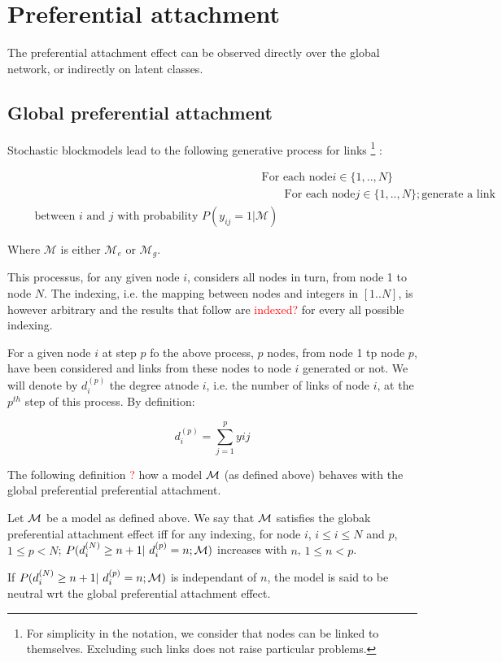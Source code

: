 
\section{Preferential attachment}

The preferential attachment effect can be observed directly over the global network, or indirectly on latent classes.

\subsection{Global preferential attachment}

Stochastic blockmodels lead to the following generative process for links \footnote{For simplicity in the notation, we consider that nodes can be linked to themselves. Excluding such links does not raise particular problems.} :

\begin{align*}
    &\textrm{For each node} i \in \{1, .., N\}  \\
    &\qquad\textrm{For each node} j \in \{1, .., N\}; \textrm{generate a link}  \\
    \qquad\textrm{between } i \textrm{ and } j \textrm{ with probability } P(y_{ij}=1 | \mathcal{M})
\end{align*}

Where $\mathcal{M}$ is either $\mathcal{M}_e$ or $\mathcal{M}_g$.

This processus, for any given node $i$, considers all nodes in turn, from node 1 to node $N$. The indexing, i.e. the mapping between nodes and integers in $[1..N]$, is however arbitrary and the results that follow are \textcolor{red}{indexed?} for every all possible indexing.

For a given node $i$ at step $p$ fo the above process, $p$ nodes, from node 1 tp node $p$, have been considered and links from these nodes to node $i$ generated or not. We will denote by $d_i^{(p)}$ the degree atnode $i$, i.e. the number of links of node $i$, at the $p^{th}$ step of this process. By definition:

\begin{equation*}
d_i^{(p)} = \sum_{j=1}^p yij
\end{equation*}

The following definition \textcolor{red}{?} how a model $\mathcal{M}$ (as defined above) behaves with the global preferential preferential attachment.

\begin{definition}
Let $\mathcal{M}$ be a model as defined above. We say that $\mathcal{M}$ satisfies the globak preferential attachment effect iff for any indexing, for node $i$, $i \leq i \leq N$ and $p$, $1 \leq p < N$; 
$P(d_i^{(N)} \geq n+1 | d_i^{(p)} = n; \M)$ increases with $n$, $1 \leq n < p$.

If $P(d_i^{(N)} \geq n+1 | d_i^{(p)} = n; \M)$ is independant of $n$, the model is said to be neutral wrt the global preferential attachment effect.

\end{definition}

